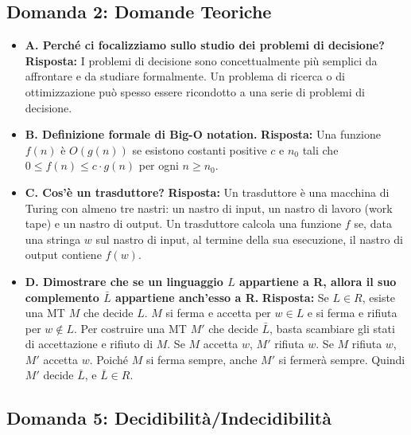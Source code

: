 \documentclass[a4paper]{article}
\begin{document}
\subsection{Domanda 2: Domande Teoriche}
\begin{itemize}
    \item \textbf{A. Perché ci focalizziamo sullo studio dei problemi di decisione?}
    \textbf{Risposta:} I problemi di decisione sono concettualmente più semplici da affrontare e da studiare formalmente. Un problema di ricerca o di ottimizzazione può spesso essere ricondotto a una serie di problemi di decisione.

    \item \textbf{B. Definizione formale di Big-O notation.}
    \textbf{Risposta:} Una funzione $f(n)$ è $O(g(n))$ se esistono costanti positive $c$ e $n_0$ tali che $0 \le f(n) \le c \cdot g(n)$ per ogni $n \ge n_0$.

    \item \textbf{C. Cos'è un trasduttore?}
    \textbf{Risposta:} Un trasduttore è una macchina di Turing con almeno tre nastri: un nastro di input, un nastro di lavoro (work tape) e un nastro di output. Un trasduttore calcola una funzione $f$ se, data una stringa $w$ sul nastro di input, al termine della sua esecuzione, il nastro di output contiene $f(w)$.

    \item \textbf{D. Dimostrare che se un linguaggio $L$ appartiene a R, allora il suo complemento $\bar{L}$ appartiene anch'esso a R.}
    \textbf{Risposta:} Se $L \in R$, esiste una MT $M$ che decide $L$. $M$ si ferma e accetta per $w \in L$ e si ferma e rifiuta per $w \notin L$. Per costruire una MT $M'$ che decide $\bar{L}$, basta scambiare gli stati di accettazione e rifiuto di $M$. Se $M$ accetta $w$, $M'$ rifiuta $w$. Se $M$ rifiuta $w$, $M'$ accetta $w$. Poiché $M$ si ferma sempre, anche $M'$ si fermerà sempre. Quindi $M'$ decide $\bar{L}$, e $\bar{L} \in R$.
\end{itemize}

\subsection{Domanda 5: Decidibilità/Indecidibilità}
\end{document}
